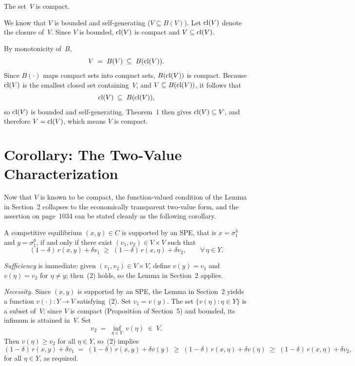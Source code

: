 The set~$V$ is compact.
\endProposition

\Proof
We know that $V$ is bounded and self-generating ($V\subseteq B(V)$).
Let ${\rm cl}(V)$ denote the closure of~$V$.  Since $V$ is bounded,
${\rm cl}(V)$ is compact and $V\subseteq{\rm cl}(V)$.

By monotonicity of~$B$,
$$  V \;=\; B(V) \;\subseteq\; B({\rm cl}(V)) .  $$
Since $B(\cdot)$ maps compact sets into compact sets,
$B({\rm cl}(V))$ is compact.  Because ${\rm cl}(V)$ is the smallest
closed set containing~$V$, and $V\subseteq B({\rm cl}(V))$, it follows
that
$$  {\rm cl}(V) \;\subseteq\; B({\rm cl}(V)) ,  $$
so ${\rm cl}(V)$ is bounded and self-generating.  Theorem~1 then gives
${\rm cl}(V)\subseteq V$, and therefore $V={\rm cl}(V)$, which means
$V$ is compact.
\endProof

\section{Corollary: The Two-Value Characterization}

Now that $V$ is known to be compact, the function-valued condition of
the Lemma in Section~2 collapses to the economically transparent
two-value form, and the assertion on page~1034 can be stated cleanly
as the following corollary.

A competitive equilibrium $(x,y)\in C$ is supported by an SPE, that
is $x=\sigma^h_1$ and $y=\sigma^g_1$, if and only if there exist
$(v_1,v_2)\in V\times V$ such that
$$  (1-\delta)\,r(x,y)+\delta v_1
    \;\geq\;
    (1-\delta)\,r(x,\eta)+\delta v_2 ,
    \qquad \forall\,\eta\in Y .  $$
\endCorollary

\Proof
{\sl Sufficiency\/} is immediate: given $(v_1,v_2)\in V\times V$,
define $v(y)=v_1$ and $v(\eta)=v_2$ for $\eta\neq y$; then~(2) holds,
so the Lemma in Section~2 applies.

\medskip
{\sl Necessity.\/}
Since $(x,y)$ is supported by an SPE, the Lemma in Section~2 yields a
function $v(\cdot):Y\to V$ satisfying~(2).  Set $v_1=v(y)$.  The
set $\{v(\eta):\eta\in Y\}$ is a subset of~$V$; since $V$ is compact
(Proposition of Section~5) and bounded, its infimum is attained in~$V$.
Set
$$  v_2 \;=\; \inf_{\eta\in Y}\,v(\eta) \;\in\; V .  $$
Then $v(\eta)\geq v_2$ for all $\eta\in Y$, so~(2) implies
$$  (1-\delta)\,r(x,y)+\delta v_1
    \;=\; (1-\delta)\,r(x,y)+\delta v(y)
    \;\geq\; (1-\delta)\,r(x,\eta)+\delta v(\eta)
    \;\geq\; (1-\delta)\,r(x,\eta)+\delta v_2 ,  $$
for all $\eta\in Y$, as required.
\endProof

